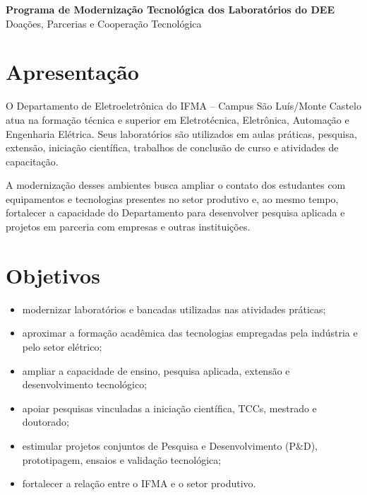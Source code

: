 \documentclass[12pt,a4paper]{article}
\begin{document}
\cabecalhoInstitucional

\begin{center}
{\LARGE\bfseries\color{azulpetroleo} Programa de Modernização Tecnológica dos Laboratórios do DEE}\\[2mm]
{\large Doações, Parcerias e Cooperação Tecnológica}
\end{center}

\section{Apresentação}
O Departamento de Eletroeletrônica do IFMA -- Campus São Luís/Monte Castelo atua na formação técnica e superior em Eletrotécnica, Eletrônica, Automação e Engenharia Elétrica. Seus laboratórios são utilizados em aulas práticas, pesquisa, extensão, iniciação científica, trabalhos de conclusão de curso e atividades de capacitação.

A modernização desses ambientes busca ampliar o contato dos estudantes com equipamentos e tecnologias presentes no setor produtivo e, ao mesmo tempo, fortalecer a capacidade do Departamento para desenvolver pesquisa aplicada e projetos em parceria com empresas e outras instituições.

\section{Objetivos}
\begin{itemize}[leftmargin=*]
\item modernizar laboratórios e bancadas utilizadas nas atividades práticas;
\item aproximar a formação acadêmica das tecnologias empregadas pela indústria e pelo setor elétrico;
\item ampliar a capacidade de ensino, pesquisa aplicada, extensão e desenvolvimento tecnológico;
\item apoiar pesquisas vinculadas a iniciação científica, TCCs, mestrado e doutorado;
\item estimular projetos conjuntos de Pesquisa e Desenvolvimento (P\&D), prototipagem, ensaios e validação tecnológica;
\item fortalecer a relação entre o IFMA e o setor produtivo.
\end{itemize}
\end{document}
